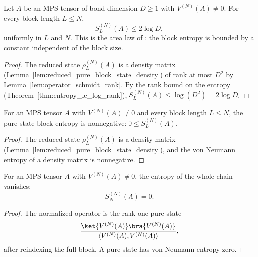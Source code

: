 \begin{proposition}\label{prop:pure_area_upper}
    \leanok
    Let $A$ be an MPS tensor of bond dimension $D\ge 1$ with $V^{(N)}(A)\neq 0$.
    For every block length $L\le N$,
    \[
        S_L^{(N)}(A) \le 2\log D,
    \]
    uniformly in $L$ and $N$. This is the area law of
    \cite[Section~3, line~599]{Cirac2016MPDO_arXiv}: the block entropy is bounded
    by a constant independent of the block size.
\end{proposition}
\begin{proof}\leanok
    The reduced state $\rho_L^{(N)}(A)$ is a density matrix
    (Lemma~\ref{lem:reduced_pure_block_state_density}) of rank at most $D^2$ by
    Lemma~\ref{lem:operator_schmidt_rank}. By the rank bound on the entropy
    (Theorem~\ref{thm:entropy_le_log_rank}),
    $S_L^{(N)}(A) \le \log(D^2) = 2\log D$.
\end{proof}

\begin{lemma}
    \label{lem:pure_block_entropy_nonneg}
    \leanok
    For an MPS tensor $A$ with $V^{(N)}(A)\neq 0$ and every block length $L\le N$,
    the pure-state block entropy is nonnegative: $0 \le S_L^{(N)}(A)$.
\end{lemma}
\begin{proof}\leanok
    The reduced state $\rho_L^{(N)}(A)$ is a density matrix
    (Lemma~\ref{lem:reduced_pure_block_state_density}), and the von Neumann
    entropy of a density matrix is nonnegative.
\end{proof}

\begin{lemma}
    \label{lem:pure_entropy_full}
    \leanok
    For an MPS tensor $A$ with $V^{(N)}(A)\neq 0$, the entropy of the whole chain
    vanishes:
    \[
        S_N^{(N)}(A) = 0 .
    \]
\end{lemma}
\begin{proof}\leanok
    The normalized operator is the rank-one pure state
    \[
        \frac{\ket{V^{(N)}(A)}\bra{V^{(N)}(A)}}
        {\langle V^{(N)}(A), V^{(N)}(A)\rangle} ,
    \]
    after reindexing the full block. A pure state has von Neumann entropy zero.
\end{proof}

